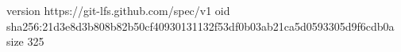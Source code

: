 version https://git-lfs.github.com/spec/v1
oid sha256:21d3e8d3b808b82b50cf40930131132f53df0b03ab21ca5d0593305d9f6cdb0a
size 325
